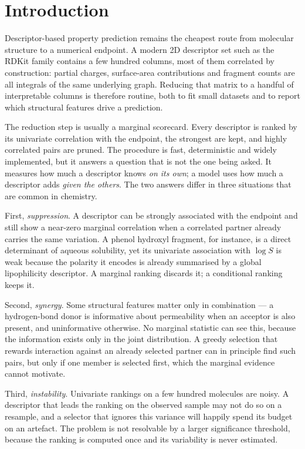 \section{Introduction}

Descriptor-based property prediction remains the cheapest route from molecular
structure to a numerical endpoint. A modern 2D descriptor set such as the RDKit
family contains a few hundred columns, most of them correlated by construction:
partial charges, surface-area contributions and fragment counts are all
integrals of the same underlying graph. Reducing that matrix to a handful of
interpretable columns is therefore routine, both to fit small datasets and to
report which structural features drive a prediction.

The reduction step is usually a marginal scorecard. Every descriptor is ranked
by its univariate correlation with the endpoint, the strongest are kept, and
highly correlated pairs are pruned. The procedure is fast, deterministic and
widely implemented, but it answers a question that is not the one being asked.
It measures how much a descriptor knows \emph{on its own}; a model uses how much
a descriptor adds \emph{given the others}. The two answers differ in three
situations that are common in chemistry.

First, \emph{suppression}. A descriptor can be strongly associated with the
endpoint and still show a near-zero marginal correlation when a correlated
partner already carries the same variation. A phenol hydroxyl fragment, for
instance, is a direct determinant of aqueous solubility, yet its univariate
association with $\log S$ is weak because the polarity it encodes is already
summarised by a global lipophilicity descriptor. A marginal ranking discards it;
a conditional ranking keeps it.

Second, \emph{synergy}. Some structural features matter only in combination ---
a hydrogen-bond donor is informative about permeability when an acceptor is also
present, and uninformative otherwise. No marginal statistic can see this,
because the information exists only in the joint distribution. A greedy
selection that rewards interaction against an already selected partner can in
principle find such pairs, but only if one member is selected first, which the
marginal evidence cannot motivate.

Third, \emph{instability}. Univariate rankings on a few hundred molecules are
noisy. A descriptor that leads the ranking on the observed sample may not do so
on a resample, and a selector that ignores this variance will happily spend its
budget on an artefact. The problem is not resolvable by a larger significance
threshold, because the ranking is computed once and its variability is never
estimated.

